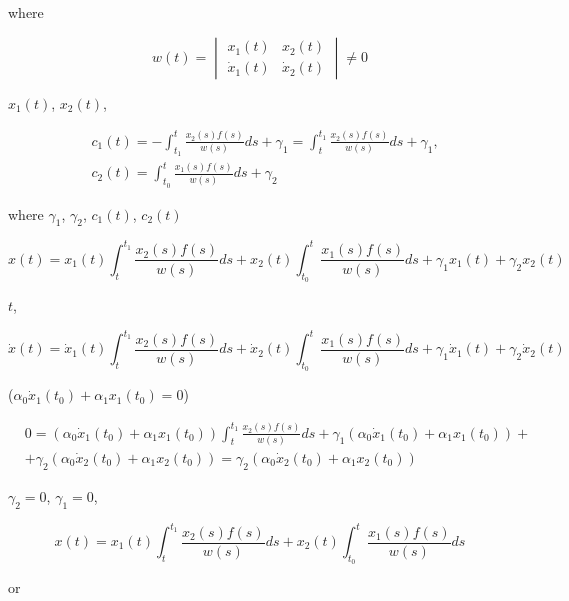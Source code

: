 \documentclass{article}
\theoremstyle{plain} \newtheorem*{theorem*}{Теорема}
\theoremstyle{plain} \newtheorem{theorem}{Теорема}[section]
\theoremstyle{definition} \newtheorem*{corollary*}{Следствие}
\theoremstyle{definition} \newtheorem{corollary}{Следствие}[section]
\theoremstyle{remark} \newtheorem*{example*}{Пример}
\begin{document}
where

\begin{equation*}
    w(t) =
    \begin{vmatrix}
        x_1(t) & x_2(t) \\
        \dot{x}_1(t) & \dot{x}_2(t)
    \end{vmatrix}
    \ne 0
\end{equation*}

$x_1(t)$,
$x_2(t)$,

\begin{align*}
    & c_1(t) = - \int^t_{t_1} \frac{x_2(s)f(s)}{w(s)} ds + \gamma_1
    = \int^{t_1}_t \frac{x_2(s)f(s)}{w(s)} ds + \gamma_1, \\
    & c_2(t) = \int^t_{t_0} \frac{x_1(s)f(s)}{w(s)} ds + \gamma_2
\end{align*}

where $\gamma_1$, $\gamma_2$,
$c_1(t)$, $c_2(t)$

\begin{equation}
    x(t) =
    x_1(t)\int^{t_1}_t \frac{x_2(s)f(s)}{w(s)} ds +
    x_2(t)\int^t_{t_0} \frac{x_1(s)f(s)}{w(s)} ds
    + \gamma_1 x_1(t)
    + \gamma_2 x_2(t)
\end{equation}

$t$,

\begin{equation}
    \dot{x}(t) =
    \dot{x}_1(t)\int^{t_1}_t \frac{x_2(s)f(s)}{w(s)} ds +
    \dot{x}_2(t)\int^t_{t_0} \frac{x_1(s)f(s)}{w(s)} ds
    + \gamma_1 \dot{x}_1(t)
    + \gamma_2 \dot{x}_2(t)
\end{equation}

($\alpha_0 \dot{x}_1(t_0) + \alpha_1 x_1(t_0) = 0$)

\begin{align*}
    & 0 =
    (\alpha_0 \dot{x}_1(t_0) + \alpha_1 x_1(t_0))
    \int^{t_1}_t \frac{x_2(s)f(s)}{w(s)} ds +
    \gamma_1
    (\alpha_0 \dot{x}_1(t_0) + \alpha_1 x_1(t_0)) + \\
    & + \gamma_2(\alpha_0 \dot{x}_2(t_0) + \alpha_1 x_2(t_0)) =
    \gamma_2(\alpha_0 \dot{x}_2(t_0) + \alpha_1 x_2(t_0))
\end{align*}

$\gamma_2 = 0$,
$\gamma_1 = 0$,

\begin{equation*}
    x(t) =
    x_1(t)\int^{t_1}_t \frac{x_2(s)f(s)}{w(s)} ds +
    x_2(t)\int^t_{t_0} \frac{x_1(s)f(s)}{w(s)} ds
\end{equation*}

or
\end{document}
